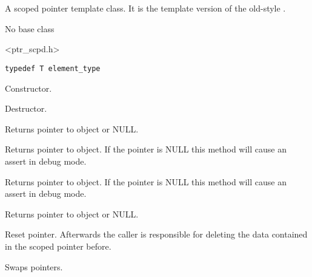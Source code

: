\section{}\label{wxscopedptrtemplate}

A scoped pointer template class. It is the template version of
the old-style .


No base class


<ptr\_scpd.h>


{\small%
\begin{verbatim}
typedef T element_type
\end{verbatim}
}%



\label{wxscopedptrtemplatewxscopedptrtemplate}


Constructor.

\label{wxscopedptrtemplatedtor}


Destructor.

\label{wxscopedptrtemplateget}


Returns pointer to object or NULL.

\label{wxscopedptrtemplateoperatorptrt}


Returns pointer to object. If the pointer is NULL this method will 
cause an assert in debug mode.

\label{wxscopedptrtemplateoperatorderef}


Returns pointer to object. If the pointer is NULL this method will 
cause an assert in debug mode.

\label{wxscopedptrtemplaterelease}


Returns pointer to object or NULL.

\label{wxscopedptrtemplatereset}


Reset pointer. Afterwards the caller is responsible for deleting
the data contained in the scoped pointer before.

\label{wxscopedptrtemplateswap}


Swaps pointers.

